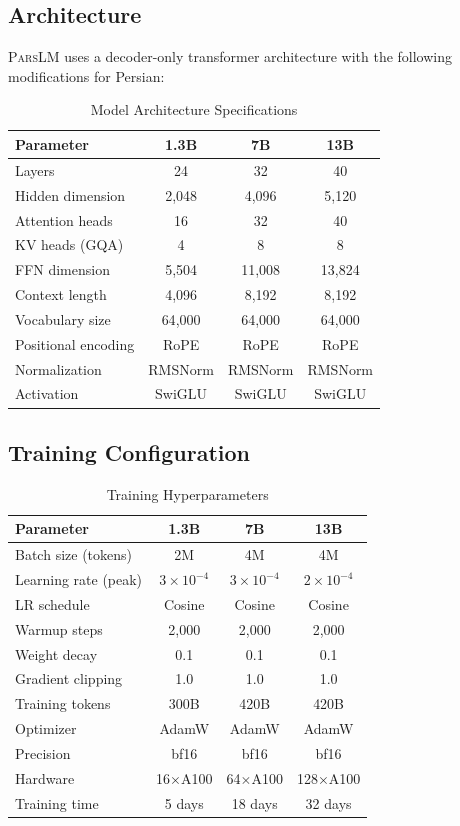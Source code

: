 \documentclass[11pt,a4paper]{article}
\newcommand{\parslm}{\textsc{ParsLM}\xspace}
\begin{document}
\subsection{Architecture}

\parslm uses a decoder-only transformer architecture with the following modifications for Persian:

\begin{table}[H]
\centering
\caption{Model Architecture Specifications}
\label{tab:arch}
\begin{tabular}{lccc}
\toprule
\textbf{Parameter} & \textbf{1.3B} & \textbf{7B} & \textbf{13B} \\
\midrule
Layers & 24 & 32 & 40 \\
Hidden dimension & 2{,}048 & 4{,}096 & 5{,}120 \\
Attention heads & 16 & 32 & 40 \\
KV heads (GQA) & 4 & 8 & 8 \\
FFN dimension & 5{,}504 & 11{,}008 & 13{,}824 \\
Context length & 4{,}096 & 8{,}192 & 8{,}192 \\
Vocabulary size & 64{,}000 & 64{,}000 & 64{,}000 \\
Positional encoding & RoPE & RoPE & RoPE \\
Normalization & RMSNorm & RMSNorm & RMSNorm \\
Activation & SwiGLU & SwiGLU & SwiGLU \\
\bottomrule
\end{tabular}
\end{table}

\subsection{Training Configuration}

\begin{table}[H]
\centering
\caption{Training Hyperparameters}
\label{tab:training}
\begin{tabular}{lccc}
\toprule
\textbf{Parameter} & \textbf{1.3B} & \textbf{7B} & \textbf{13B} \\
\midrule
Batch size (tokens) & 2M & 4M & 4M \\
Learning rate (peak) & $3 \times 10^{-4}$ & $3 \times 10^{-4}$ & $2 \times 10^{-4}$ \\
LR schedule & Cosine & Cosine & Cosine \\
Warmup steps & 2{,}000 & 2{,}000 & 2{,}000 \\
Weight decay & 0.1 & 0.1 & 0.1 \\
Gradient clipping & 1.0 & 1.0 & 1.0 \\
Training tokens & 300B & 420B & 420B \\
Optimizer & AdamW & AdamW & AdamW \\
Precision & bf16 & bf16 & bf16 \\
Hardware & 16$\times$A100 & 64$\times$A100 & 128$\times$A100 \\
Training time & 5 days & 18 days & 32 days \\
\bottomrule
\end{tabular}
\end{table}
\end{document}
